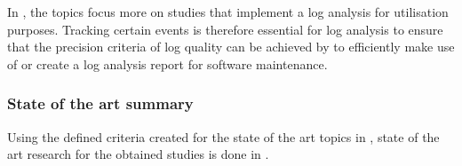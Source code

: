 In , the topics focus more on studies that implement a log analysis for utilisation purposes. Tracking certain events is therefore essential for log analysis to ensure that the precision criteria of log quality can be achieved by  to efficiently make use of or create a log analysis report for software maintenance.

\subsubsection{State of the art summary}
Using the defined criteria created for the state of the art topics in , state of the art research for the obtained studies is done in .

\clearpage

\newcommand{\sotaCore}{\rowcolor{lightgray}
\cite{Ogheneovo2014} & Partial & \cmark & \cmark & \xmark & \xmark & \xmark \\
\cite{Tang2010} & Partial & Partial & \cmark & \xmark & \xmark & \xmark \\
\rowcolor{lightgray}
\cite{Sneed2004} & Partial & \cmark & \cmark & \xmark & \xmark & \xmark \\
\cite{Stojanov2017} & \xmark & \cmark & \cmark & \xmark & \xmark & \xmark \\
\rowcolor{lightgray}
\cite{Galster2019} & \cmark & Partial & \xmark & \xmark & \xmark & \xmark \\
\cite{Lenarduzzi2017} & Partial & \cmark & \cmark & \xmark & \xmark & \xmark \\
\rowcolor{lightgray}
\cite{Araujo2021} & Partial & \xmark & \cmark & \xmark & \xmark & \xmark \\	
\cite{Zhu2019} & \xmark & \xmark & \xmark & \cmark & Partial & \xmark \\
\rowcolor{lightgray}
\cite{Rong2018} & \xmark & \xmark & \xmark & Partial & Partial & \xmark \\
\cite{Zhu2015} & \xmark & \xmark & \xmark & \cmark & \cmark & \xmark \\
\rowcolor{lightgray}
\cite{Kherbouche2017} & \xmark & \xmark & \xmark & Partial & Partial & \xmark \\
\cite{Hasiloglu2018} & \xmark & \xmark & \xmark & \cmark & \cmark & Partial \\
\rowcolor{lightgray}
\cite{Slaninova2014} & \xmark & \xmark & \xmark & \cmark & \cmark & Partial \\
\cite{Waqar2017} & \xmark & \xmark & \xmark & \xmark & \xmark & \cmark \\
\rowcolor{lightgray}
\cite{Kumar2017} & \xmark & \xmark & \xmark & \xmark & \xmark & \cmark \\
}

